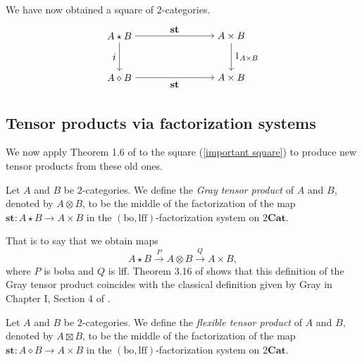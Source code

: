 \documentclass{tac}
\begin{document}
We have now obtained a square of $2$-categories.
\begin{equation}\label{important square}
    \begin{tikzpicture}[baseline=(current bounding box.center)]
\node (TL) at (0,1.5)
{$A\star B$};
\node (TR) at (4,1.5)
{$A\times B$};
\node (BL) at (0,0)
{$A\diamond B$};
\node (BR) at (4,0)
{$A\times B$};

\draw[->] (TL) to node[above]{$\mathbf{st}$} (TR);
\draw[->] (TL) to node[left]{$i$} (BL);
\draw[->] (TR) to node[right]{$1_{A\times B}$} (BR);
\draw[->] (BL) to node[below]{$\mathbf{st}$} (BR);
\end{tikzpicture}
\end{equation}

\subsection*{Tensor products via factorization systems}
We now apply Theorem 1.6 of \cite{BourkeGurski} to the square (\ref{important square}) to produce new tensor products from these old ones.

\begin{definition}
Let $A$ and $B$ be $2$-categories. We define the \emph{Gray tensor product} of $A$ and $B$, denoted by $A\otimes B$, to be the middle of the factorization of the map $\mathbf{st}:A\star B\to A\times B$  in the $(\mathrm{bo},\mathrm{lff})$-factorization system on $2\mathbf{Cat}$.
\end{definition}

That is to say that we obtain maps
\[
A\star B\xrightarrow{P}A\otimes B\xrightarrow{Q}A\times B,
\]
where $P$ is boba and $Q$ is lff. Theorem 3.16 of \cite{BourkeGurski} shows that this definition of the Gray tensor product coincides with the classical definition given by Gray in Chapter I, Section 4 of \cite{Gray1974}.

\begin{definition}
Let $A$ and $B$ be $2$-categories. We define the \emph{flexible tensor product} of $A$ and $B$, denoted by $A\boxtimes B$, to be the middle of the factorization of the map $\mathbf{st}:A\diamond B\to A\times B$ in the $(\mathrm{bo},\mathrm{lff})$-factorization system on $2\mathbf{Cat}$.
\end{definition}
\end{document}
